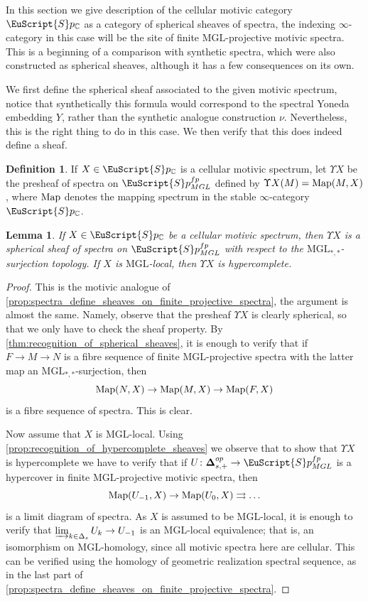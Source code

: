 \documentclass[oneside,a4paper]{amsart}
\newcommand{\euscr}[1]{\EuScript{#1}} %
\newcommand{\Map}{\textnormal{Map}} %
\newcommand{\MGL}{\mathrm{MGL}} %
\newcommand{\spectra}{\euscr{S}p} %
\newcommand{\cspectra}{\euscr{S}p_{\mathbb{C}}} %
\newcommand{\spectramglfp}{\spectra_{MGL}^{fp}} %
\newcommand{\thickdelta}{\mathbf{\Delta}} %
\theoremstyle{plain}
\newtheorem{lemma}[thm]{Lemma}
\theoremstyle{definition}
\newtheorem{defin}[thm]{Definition}
\theoremstyle{remark}
\begin{document}
In this section we give description of the cellular motivic category $\cspectra$ as a category of spherical sheaves of spectra, the indexing $\infty$-category in this case will be the site of finite $\MGL$-projective motivic spectra. This is a beginning of a comparison with synthetic spectra, which were also constructed as spherical sheaves, although it has a few consequences on its own. 

We first define the spherical sheaf associated to the given motivic spectrum, notice that synthetically this formula would correspond to the spectral Yoneda embedding $Y$, rather than the synthetic analogue construction $\nu$. Nevertheless, this is the right thing to do in this case. We then verify that this does indeed define a sheaf. 

\begin{defin}
If $X \in \cspectra$ is a cellular motivic spectrum, let $\Upsilon X$ be the presheaf of spectra on $\spectramglfp$ defined by $\Upsilon X(M) = \Map(M, X)$, where $\Map$ denotes the mapping spectrum in the stable $\infty$-category $\cspectra$.
\end{defin}

\begin{lemma}
\label{lemma:cellular_motivic_spectrum_defines_a_sheaf_on_mglfp_spectra}
If $X \in \cspectra$ be a cellular motivic spectrum, then $\Upsilon X$ is a spherical sheaf of spectra on $\spectramglfp$ with respect to the $\MGL_{*,*}$-surjection topology. If $X$ is $\MGL$-local, then $\Upsilon X$ is hypercomplete. 
\end{lemma}

\begin{proof}
This is the motivic analogue of \cref{prop:spectra_define_sheaves_on_finite_projective_spectra}, the argument is almost the same. Namely, observe that the presheaf $\Upsilon X$ is clearly spherical, so that we only have to check the sheaf property. By \cref{thm:recognition_of_spherical_sheaves}, it is enough to verify that if $F \rightarrow M \rightarrow N$ is a fibre sequence of finite $\MGL$-projective spectra with the latter map an $\MGL_{*, *}$-surjection, then
\[
\Map(N, X) \rightarrow \Map(M, X) \rightarrow \Map(F, X)
\]
is a fibre sequence of spectra. This is clear. 

Now assume that $X$ is $\MGL$-local. Using \cref{prop:recognition_of_hypercomplete_sheaves} we observe that to show that $\Upsilon X$ is hypercomplete we have to verify that if $U \colon \thickdelta^{op}_{s, +} \rightarrow \spectramglfp$ is a hypercover in finite $\MGL$-projective motivic spectra, then
\[
\Map(U_{-1}, X) \rightarrow \Map(U_{0}, X) \rightrightarrows \ldots
\]
is a limit diagram of spectra. As $X$ is assumed to be $\MGL$-local, it is enough to verify that $\varinjlim_{k \in \Delta_{s}} U_{k} \rightarrow U_{-1}$ is an $\MGL$-local equivalence; that is, an isomorphism on $\MGL$-homology, since all motivic spectra here are cellular. This can be verified using the homology of geometric realization spectral sequence, as in the last part of \cref{prop:spectra_define_sheaves_on_finite_projective_spectra}. 
\end{proof}
\end{document}
